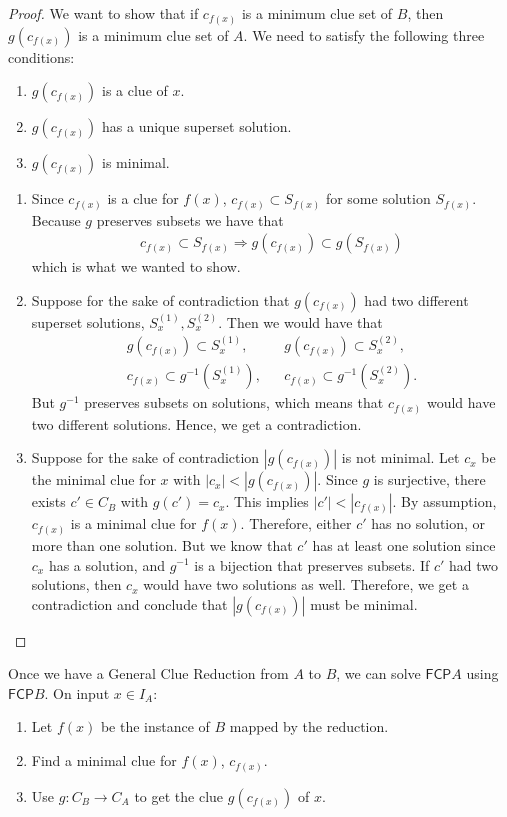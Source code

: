 \documentclass[runningheads,a4paper]{llncs}
\begin{document}
\begin{proof}
We want to show that if $c_{f(x)}$ is a minimum clue set of $B$, then $g(c_{f(x)})$ is a minimum clue set of $A$. We need to satisfy the following three conditions:
\begin{enumerate}
\item $g(c_{f(x)})$ is a clue of $x$. 
\item $g(c_{f(x)})$ has a unique superset solution.
\item $g(c_{f(x)})$ is minimal.
\end{enumerate}

\begin{enumerate}
\item Since $c_{f(x)}$ is a clue for $f(x)$, $c_{f(x)} \subset S_{f(x)}$ for some solution $S_{f(x)}$. Because $g$ preserves subsets we have that 
\begin{align*} c_{f(x)} \subset S_{f(x)} \Rightarrow g(c_{f(x)}) \subset g(S_{f(x)}) \end{align*}
which is what we wanted to show. 
\item Suppose for the sake of contradiction that $g(c_{f(x)})$ had two different superset solutions, $S_x^{(1)}, S_x^{(2)}$. Then we would have that
\begin{align*}
g(c_{f(x)}) \subset S_x^{(1)}, && g(c_{f(x)}) \subset S_x^{(2)}, \\
c_{f(x)} \subset g^{-1}(S_x^{(1)}), && c_{f(x)} \subset g^{-1}(S_x^{(2)}).
\end{align*}
But $g^{-1}$ preserves subsets on solutions, which means that $c_{f(x)}$ would have two different solutions. Hence, we get a contradiction. 
\item Suppose for the sake of contradiction $|g(c_{f(x)})|$ is not minimal. Let $c_x$ be the minimal clue for $x$ with $|c_x| < |g(c_{f(x)})|$. Since $g$ is surjective, there exists $c' \in C_B$ with $g(c') = c_x$. This implies $|c'| < |c_{f(x)}|$. By assumption, $c_{f(x)}$ is a minimal clue for $f(x)$. Therefore, either $c'$ has no solution, or more than one solution. But we know that $c'$ has at least one solution since $c_x$ has a solution, and $g^{-1}$ is a bijection that preserves subsets. If $c'$ had two solutions, then $c_x$ would have two solutions as well. Therefore, we get a contradiction and conclude that $|g(c_{f(x)})|$ must be minimal.
\end{enumerate}
\end{proof}

Once we have a General Clue Reduction from $A$ to $B$, we can solve $\mathsf{FCP} A$ using $\mathsf{FCP} B$. On input $x \in I_A$:
\begin{enumerate}
\item Let $f(x)$ be the instance of $B$ mapped by the reduction.
\item Find a minimal clue for $f(x)$, $c_{f(x)}$. 
\item Use $g: C_B \rightarrow C_A$ to get the clue $g(c_{f(x)})$ of $x$.
\end{enumerate}
\end{document}
